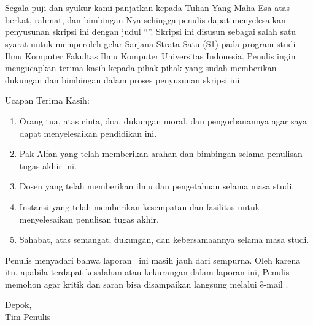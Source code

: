 \chapter*{\kataPengantar}
\pagestyle{first-pages}

Segala puji dan syukur kami panjatkan kepada Tuhan Yang Maha Esa atas berkat,
rahmat, dan bimbingan-Nya sehingga penulis dapat menyelesaikan penyusunan skripsi ini dengan judul ``\judul{}''. Skripsi ini disusun sebagai salah satu syarat untuk memperoleh gelar Sarjana Strata Satu (S1) pada program studi Ilmu Komputer Fakultas Ilmu Komputer Universitas Indonesia. Penulis ingin mengucapkan terima kasih kepada pihak-pihak yang sudah memberikan dukungan dan bimbingan dalam proses penyusunan skripsi ini.

Ucapan Terima Kasih:
\begin{enumerate}[topsep=0pt,itemsep=-1ex,partopsep=1ex,parsep=1ex]
	\item Orang tua, atas cinta, doa, dukungan moral, dan pengorbanannya agar saya dapat menyelesaikan pendidikan ini.
	\item Pak Alfan yang telah memberikan arahan dan bimbingan selama penulisan tugas akhir ini.
	\item Dosen yang telah memberikan ilmu dan pengetahuan selama masa studi.
	\item Instansi yang telah memberikan kesempatan dan fasilitas untuk menyelesaikan penulisan tugas akhir.
	\item Sahabat, atas semangat, dukungan, dan kebersamaannya selama masa studi.
\end{enumerate}

Penulis menyadari bahwa laporan \type~ini masih jauh dari sempurna. Oleh karena itu, apabila terdapat kesalahan atau kekurangan dalam laporan ini, Penulis memohon agar kritik dan saran bisa disampaikan langsung melalui \f{e-mail} .


\vspace*{0.1cm}
\begin{flushright}
Depok, \tanggalSiapSidang\\[0.1cm]
\ifx\blank\npmDua
	\vspace*{1.5cm}
	\penulisSatu
\else
	Tim Penulis
\fi

\end{flushright}

